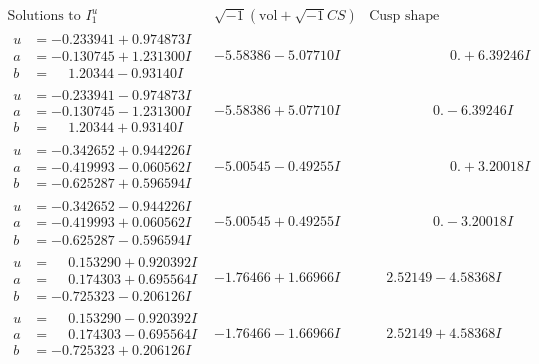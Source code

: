 \documentclass[1p]{elsarticle_modified}
\theoremstyle{definition}
\newcommand{\I}{\sqrt{-1}}
\begin{document}
$$\begin{array}{c|c|c}  
\text{Solutions to }I^u_{1}& \I (\text{vol} + \sqrt{-1}CS) & \text{Cusp shape}\\
 \hline 
\begin{aligned}
u &= -0.233941 + 0.974873 I \\
a &= -0.130745 + 1.231300 I \\
b &= \phantom{-}1.20344 - 0.93140 I\end{aligned}
 & -5.58386 - 5.07710 I & \phantom{-0.000000 -}0. + 6.39246 I \\ \hline\begin{aligned}
u &= -0.233941 - 0.974873 I \\
a &= -0.130745 - 1.231300 I \\
b &= \phantom{-}1.20344 + 0.93140 I\end{aligned}
 & -5.58386 + 5.07710 I & \phantom{-0.000000 } 0. - 6.39246 I \\ \hline\begin{aligned}
u &= -0.342652 + 0.944226 I \\
a &= -0.419993 - 0.060562 I \\
b &= -0.625287 + 0.596594 I\end{aligned}
 & -5.00545 - 0.49255 I & \phantom{-0.000000 -}0. + 3.20018 I \\ \hline\begin{aligned}
u &= -0.342652 - 0.944226 I \\
a &= -0.419993 + 0.060562 I \\
b &= -0.625287 - 0.596594 I\end{aligned}
 & -5.00545 + 0.49255 I & \phantom{-0.000000 } 0. - 3.20018 I \\ \hline\begin{aligned}
u &= \phantom{-}0.153290 + 0.920392 I \\
a &= \phantom{-}0.174303 + 0.695564 I \\
b &= -0.725323 - 0.206126 I\end{aligned}
 & -1.76466 + 1.66966 I & \phantom{-}2.52149 - 4.58368 I \\ \hline\begin{aligned}
u &= \phantom{-}0.153290 - 0.920392 I \\
a &= \phantom{-}0.174303 - 0.695564 I \\
b &= -0.725323 + 0.206126 I\end{aligned}
 & -1.76466 - 1.66966 I & \phantom{-}2.52149 + 4.58368 I \\ \hline\begin{aligned}

\end{aligned}
\end{array}$$
\end{document}
